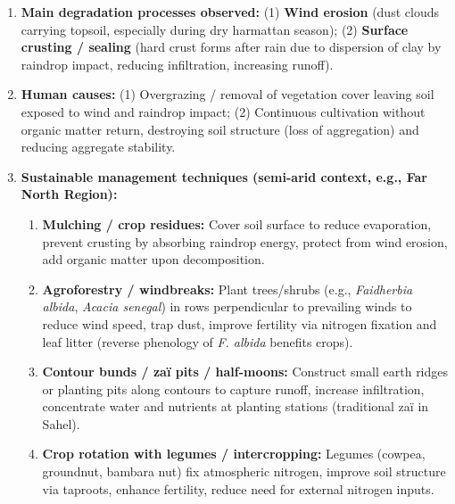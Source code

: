 \documentclass[11pt]{article}
\begin{document}
\begin{corrige}
\begin{enumerate}
\item \textbf{Main degradation processes observed:} (1) \textbf{Wind erosion} (dust clouds carrying topsoil, especially during dry harmattan season); (2) \textbf{Surface crusting / sealing} (hard crust forms after rain due to dispersion of clay by raindrop impact, reducing infiltration, increasing runoff).
\item \textbf{Human causes:} (1) Overgrazing / removal of vegetation cover leaving soil exposed to wind and raindrop impact; (2) Continuous cultivation without organic matter return, destroying soil structure (loss of aggregation) and reducing aggregate stability.
\item \textbf{Sustainable management techniques (semi-arid context, e.g., Far North Region):}
\begin{enumerate}
\item \textbf{Mulching / crop residues:} Cover soil surface to reduce evaporation, prevent crusting by absorbing raindrop energy, protect from wind erosion, add organic matter upon decomposition.
\item \textbf{Agroforestry / windbreaks:} Plant trees/shrubs (e.g., \textit{Faidherbia albida}, \textit{Acacia senegal}) in rows perpendicular to prevailing winds to reduce wind speed, trap dust, improve fertility via nitrogen fixation and leaf litter (reverse phenology of \textit{F. albida} benefits crops).
\item \textbf{Contour bunds / zaï pits / half-moons:} Construct small earth ridges or planting pits along contours to capture runoff, increase infiltration, concentrate water and nutrients at planting stations (traditional zaï in Sahel).
\item \textbf{Crop rotation with legumes / intercropping:} Legumes (cowpea, groundnut, bambara nut) fix atmospheric nitrogen, improve soil structure via taproots, enhance fertility, reduce need for external nitrogen inputs.
\end{enumerate}
\end{enumerate}
\end{corrige}
\end{document}
